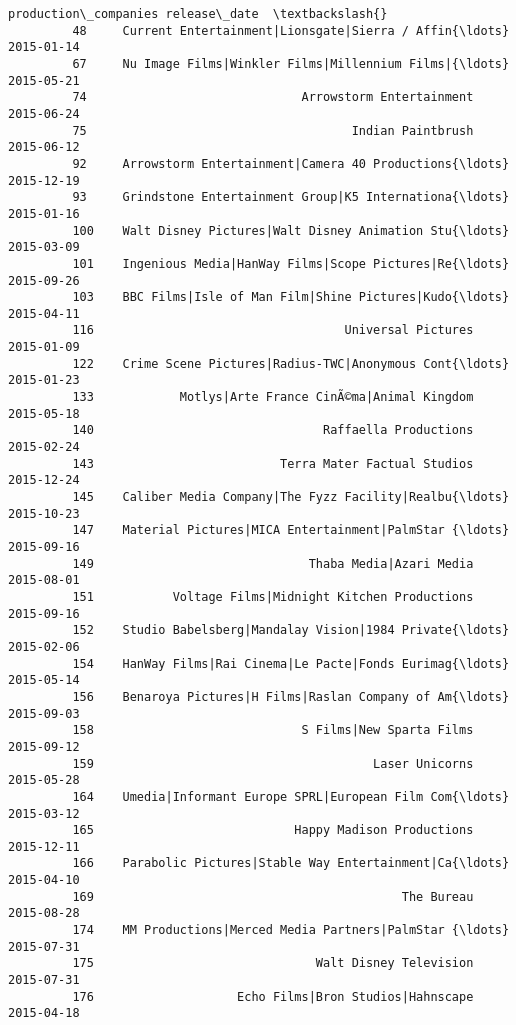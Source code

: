 \documentclass[11pt]{article}
\begin{document}
\begin{Verbatim}[commandchars=\\\{\}]
                                             production\_companies release\_date  \textbackslash{}
         48     Current Entertainment|Lionsgate|Sierra / Affin{\ldots}   2015-01-14   
         67     Nu Image Films|Winkler Films|Millennium Films|{\ldots}   2015-05-21   
         74                              Arrowstorm Entertainment   2015-06-24   
         75                                     Indian Paintbrush   2015-06-12   
         92     Arrowstorm Entertainment|Camera 40 Productions{\ldots}   2015-12-19   
         93     Grindstone Entertainment Group|K5 Internationa{\ldots}   2015-01-16   
         100    Walt Disney Pictures|Walt Disney Animation Stu{\ldots}   2015-03-09   
         101    Ingenious Media|HanWay Films|Scope Pictures|Re{\ldots}   2015-09-26   
         103    BBC Films|Isle of Man Film|Shine Pictures|Kudo{\ldots}   2015-04-11   
         116                                   Universal Pictures   2015-01-09   
         122    Crime Scene Pictures|Radius-TWC|Anonymous Cont{\ldots}   2015-01-23   
         133            Motlys|Arte France CinÃ©ma|Animal Kingdom   2015-05-18   
         140                                Raffaella Productions   2015-02-24   
         143                          Terra Mater Factual Studios   2015-12-24   
         145    Caliber Media Company|The Fyzz Facility|Realbu{\ldots}   2015-10-23   
         147    Material Pictures|MICA Entertainment|PalmStar {\ldots}   2015-09-16   
         149                              Thaba Media|Azari Media   2015-08-01   
         151           Voltage Films|Midnight Kitchen Productions   2015-09-16   
         152    Studio Babelsberg|Mandalay Vision|1984 Private{\ldots}   2015-02-06   
         154    HanWay Films|Rai Cinema|Le Pacte|Fonds Eurimag{\ldots}   2015-05-14   
         156    Benaroya Pictures|H Films|Raslan Company of Am{\ldots}   2015-09-03   
         158                             S Films|New Sparta Films   2015-09-12   
         159                                       Laser Unicorns   2015-05-28   
         164    Umedia|Informant Europe SPRL|European Film Com{\ldots}   2015-03-12   
         165                            Happy Madison Productions   2015-12-11   
         166    Parabolic Pictures|Stable Way Entertainment|Ca{\ldots}   2015-04-10   
         169                                           The Bureau   2015-08-28   
         174    MM Productions|Merced Media Partners|PalmStar {\ldots}   2015-07-31   
         175                               Walt Disney Television   2015-07-31   
         176                    Echo Films|Bron Studios|Hahnscape   2015-04-18   

\end{Verbatim}
\end{document}
